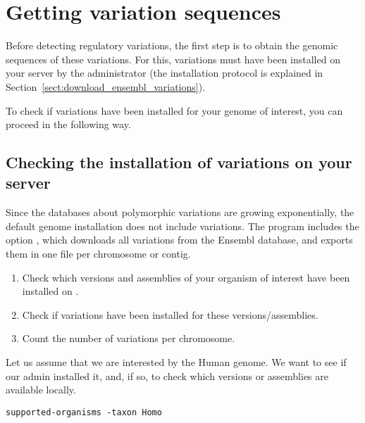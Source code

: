 

\section{Getting variation sequences}

Before detecting regulatory variations, the first step is to obtain
the genomic sequences of these variations.  For this, variations must
have been installed on your server by the \RSAT administrator (the
installation protocol is explained in
Section~\ref{sect:download_ensembl_variations}).

To check if variations have been installed for your genome of
interest, you can proceed in the following way. 


\subsection{Checking the installation of variations on your \RSAT server}

Since the databases about polymorphic variations are growing
exponentially, the default genome installation does not include
variations. The program  includes the
option , which downloads all variations from
the Ensembl database, and exports them in one file per chromosome or
contig.

\begin{enumerate}
\item Check which versions and assemblies of your organism of interest
  have been installed on \RSAT.
\item Check if variations have been installed for these
  versions/assemblies.
\item Count the number of variations per chromosome.
\end{enumerate}

Let us assume that we are interested by the Human genome. We want to
see if our \RSAT admin installed it, and, if so, to check which
versions or assemblies are available locally.

\begin{lstlisting}
supported-organisms -taxon Homo
\end{lstlisting}

